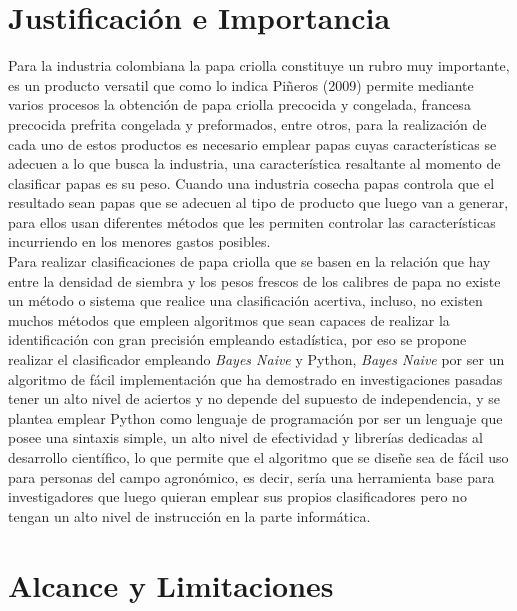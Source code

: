 \section{Justificaci\'on e Importancia}

Para la industria colombiana la papa criolla constituye un rubro muy importante, es un producto versatil que como lo indica Piñeros (2009) permite mediante varios procesos la obtención de papa criolla precocida y congelada, francesa precocida prefrita congelada y preformados, entre otros, para la realización de cada uno de estos productos es necesario emplear papas cuyas características se adecuen a lo que busca la industria, una característica resaltante al momento de clasificar papas es su peso. Cuando una industria cosecha papas controla que el resultado sean papas que se adecuen al tipo de producto que luego van a generar, para ellos usan diferentes métodos que les permiten controlar las características incurriendo en los menores gastos posibles.\\

Para realizar clasificaciones de papa criolla que se basen en la relación que hay entre la densidad de siembra y los pesos frescos de los calibres de papa no existe un método o sistema que realice una clasificación acertiva, incluso, no existen muchos métodos que empleen algoritmos que sean capaces de realizar la identificación con gran precisión empleando estadística, por eso se propone realizar el clasificador empleando \textit{Bayes Naive} y Python, \textit{Bayes Naive} por ser un algoritmo de fácil implementación que ha demostrado en investigaciones pasadas tener un alto nivel de aciertos y no depende del supuesto de independencia, y se plantea emplear Python como lenguaje de programación por ser un lenguaje que posee una sintaxis simple, un alto nivel de efectividad y librerías dedicadas al desarrollo científico, lo que permite que el algoritmo que se diseñe sea de fácil uso para personas del campo agronómico, es decir, sería una herramienta base para investigadores que luego quieran emplear sus propios clasificadores pero no tengan un alto nivel de instrucción en la parte informática.

\section{Alcance y Limitaciones}

